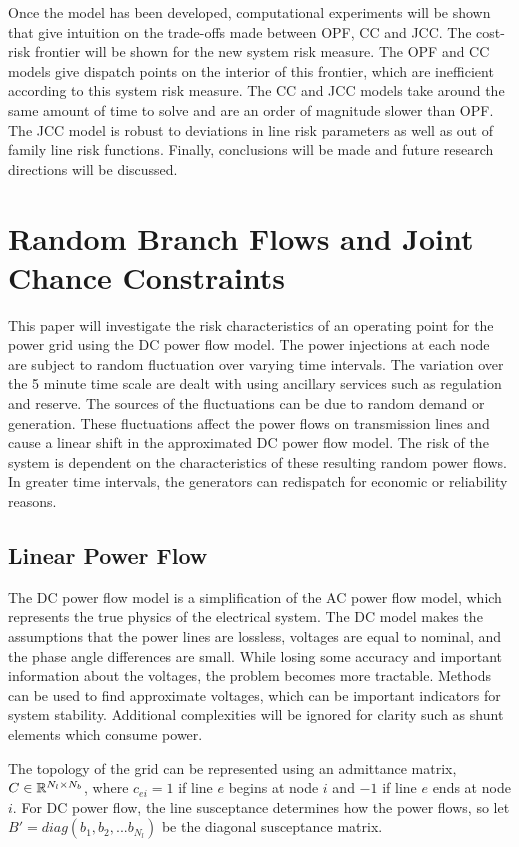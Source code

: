 Once the model has been developed, computational experiments will be shown that give intuition on the trade-offs made between OPF, CC and JCC.  The cost-risk frontier will be shown for the new system risk measure.  The OPF and CC models give dispatch points on the interior of this frontier, which are inefficient according to this system risk measure.  The CC and JCC models take around the same amount of time to solve and are an order of magnitude slower than OPF.  The JCC model is robust to deviations in line risk parameters as well as out of family line risk functions.  Finally, conclusions will be made and future research directions will be discussed.


\section{Random Branch Flows and Joint Chance Constraints} 
This paper will investigate the risk characteristics of an operating point for the power grid using the DC power flow model.  The power injections at each node are subject to random fluctuation over varying time intervals.  The variation over the 5 minute time scale are dealt with using ancillary services such as regulation and reserve.  The sources of the fluctuations can be due to random demand or generation.  These fluctuations affect the power flows on transmission lines and cause a linear shift in the approximated DC power flow model.  The risk of the system is dependent on the characteristics of these resulting random power flows.  In greater time intervals, the generators can redispatch for economic or reliability reasons.

\subsection{Linear Power Flow}
The DC power flow model is a simplification of the AC power flow model, which represents the true physics of the electrical system.  The DC model makes the assumptions that the power lines are lossless, voltages are equal to nominal, and the phase angle differences are small.  While losing some accuracy and important information about the voltages, the problem becomes more tractable.  Methods can be used to find approximate voltages, which can be important indicators for system stability.  Additional complexities will be ignored for clarity such as shunt elements which consume power.

The topology of the grid can be represented using an admittance matrix, $C \in \mathbb{R}^{N_l \times N_b}$, where $c_{ei}=1$ if line $e$ begins at node $i$ and $-1$ if line $e$ ends at node $i$.  For DC power flow, the line susceptance determines how the power flows, so let $B'=diag\left(b_1,b_2,...b_{N_l}\right)$ be the diagonal susceptance matrix.  


